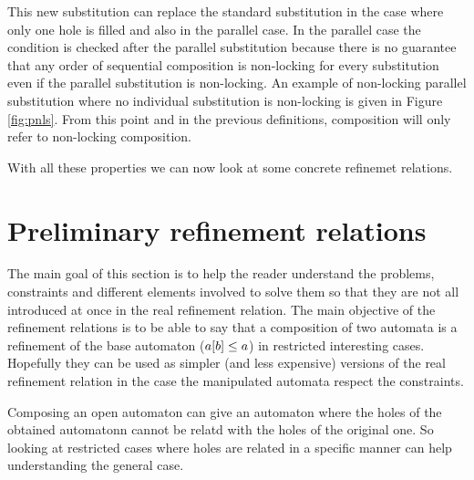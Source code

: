 \documentclass{article}
\begin{document}

This new substitution can replace the standard substitution in the case where only one hole is filled and also in the parallel case.
In the parallel case the condition is checked after the parallel substitution because there is no guarantee that any order of sequential composition is non-locking for every substitution even if the parallel substitution is non-locking.
%
%
%
An example of non-locking parallel substitution where no individual substitution is non-locking is given in Figure \ref{fig:pnls}.%
From this point and in the previous definitions, composition will only refer to non-locking composition.

With all these properties we can now look at some concrete refinemet relations.


\section{Preliminary refinement relations}\label{sec:prelref}
The main goal of this section is to help the reader understand the problems, constraints and different elements involved to solve them so that they are not all introduced at once in the real refinement relation.
The main objective of the refinement relations  is to be able to say that a composition of two automata is a refinement of the base automaton (\(a{\left[b\right]} \leq a\)) in restricted interesting cases.
Hopefully they can be used as simpler (and less expensive) versions of the real refinement relation in the case the manipulated automata respect the constraints.

Composing an open automaton can give an automaton where the holes of the obtained automatonn cannot be relatd with the holes of the original one.
So looking at restricted cases where holes are related in a specific manner can help understanding the general case.
\end{document}
